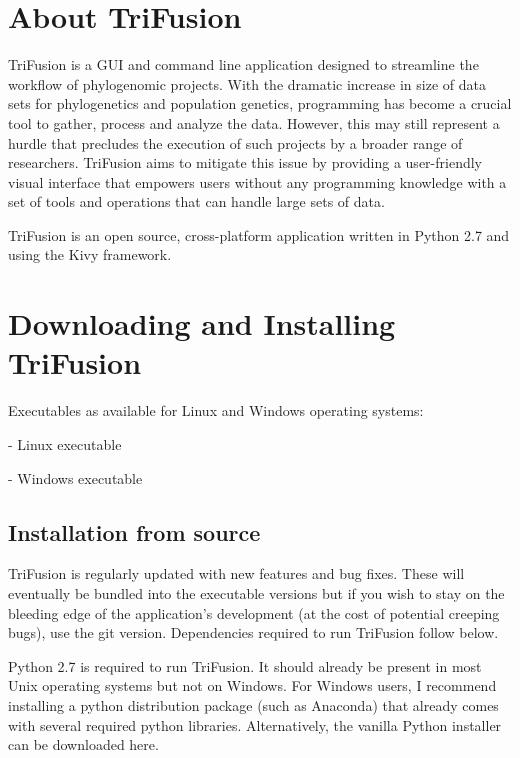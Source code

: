 \documentclass[12pt]{article}
\begin{document}
\tableofcontents

\linespread{1.5}

\pagebreak


\section{About TriFusion}

TriFusion is a GUI and command line application designed to streamline the workflow of phylogenomic projects. With the dramatic increase in size of data sets for phylogenetics and population genetics, programming has become a crucial tool to gather, process and analyze the data. However, this may still represent a hurdle that precludes the execution of such projects by a broader range of researchers. TriFusion aims to mitigate this issue by providing a user-friendly visual interface that empowers users without any programming knowledge with a set of tools and operations that can handle large sets of data.

TriFusion is an open source, cross-platform application written in Python 2.7 and using the Kivy framework.

\section{Downloading and Installing TriFusion}

Executables as available for Linux and Windows operating systems:


- Linux executable

- Windows executable

\subsection{Installation from source}

TriFusion is regularly updated with new features and bug fixes. These will eventually be bundled into the executable versions but if you wish to stay on the bleeding edge of the application's development (at the cost of potential creeping bugs), use the git version. Dependencies required to run TriFusion follow below.

Python 2.7 is required to run TriFusion. It should already be present in most Unix operating systems but not on Windows. For Windows users, I recommend installing a python distribution package (such as Anaconda) that already comes with several required python libraries. Alternatively, the vanilla Python installer can be downloaded here.
\end{document}
